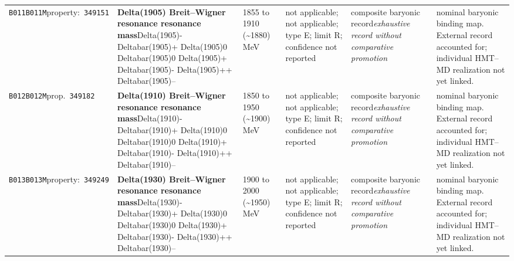 \begin{landscape}
\begin{longtable}{L{1.85cm}L{4.45cm}L{2.35cm}L{4.05cm}L{3.35cm}L{7.15cm}}
\texttt{B011}\newline \texttt{B011M}\newline property:\ \texttt{349151} & \textbf{Delta(1905) Breit--Wigner resonance resonance mass}\newline Delta(1905)- \textbar{}\allowbreak{} Deltabar(1905)+ \textbar{}\allowbreak{} Delta(1905)0 \textbar{}\allowbreak{} Deltabar(1905)0 \textbar{}\allowbreak{} Delta(1905)+ \textbar{}\allowbreak{} Deltabar(1905)- \textbar{}\allowbreak{} Delta(1905)++ \textbar{}\allowbreak{} Deltabar(1905)-- & 1855 to 1910 (\textasciitilde{}1880)\,MeV & not applicable; not applicable; type E; limit R; confidence not reported & composite baryonic record\newline \emph{exhaustive record without comparative promotion} & nominal baryonic binding map. External record accounted for; individual HMT--MD realization not yet linked. \\
\texttt{B012}\newline \texttt{B012M}\newline prop.\ \texttt{349182} & \textbf{Delta(1910) Breit--Wigner resonance resonance mass}\newline Delta(1910)- \textbar{}\allowbreak{} Deltabar(1910)+ \textbar{}\allowbreak{} Delta(1910)0 \textbar{}\allowbreak{} Deltabar(1910)0 \textbar{}\allowbreak{} Delta(1910)+ \textbar{}\allowbreak{} Deltabar(1910)- \textbar{}\allowbreak{} Delta(1910)++ \textbar{}\allowbreak{} Deltabar(1910)-- & 1850 to 1950 (\textasciitilde{}1900)\,MeV & not applicable; not applicable; type E; limit R; confidence not reported & composite baryonic record\newline \emph{exhaustive record without comparative promotion} & nominal baryonic binding map. External record accounted for; individual HMT--MD realization not yet linked. \\
\texttt{B013}\newline \texttt{B013M}\newline property:\ \texttt{349249} & \textbf{Delta(1930) Breit--Wigner resonance resonance mass}\newline Delta(1930)- \textbar{}\allowbreak{} Deltabar(1930)+ \textbar{}\allowbreak{} Delta(1930)0 \textbar{}\allowbreak{} Deltabar(1930)0 \textbar{}\allowbreak{} Delta(1930)+ \textbar{}\allowbreak{} Deltabar(1930)- \textbar{}\allowbreak{} Delta(1930)++ \textbar{}\allowbreak{} Deltabar(1930)-- & 1900 to 2000 (\textasciitilde{}1950)\,MeV & not applicable; not applicable; type E; limit R; confidence not reported & composite baryonic record\newline \emph{exhaustive record without comparative promotion} & nominal baryonic binding map. External record accounted for; individual HMT--MD realization not yet linked. \\

\end{longtable}
\end{landscape}
